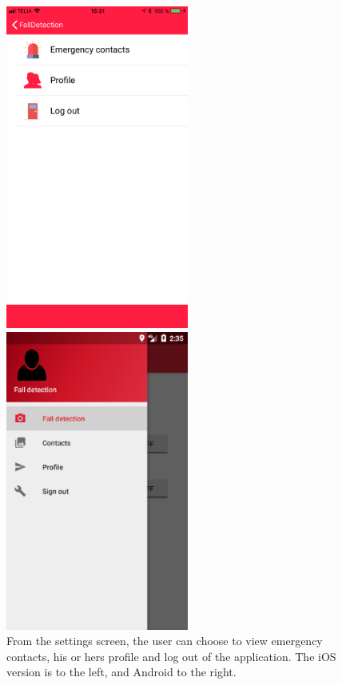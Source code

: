 \documentclass[12pt, a4paper, onecolumn]{article}
\begin{document}
	\begin{figure}[H]
		\begin{multicols}{2}
			\centering
			\includegraphics[width=6cm]{../img/screenshots/settings-screen.jpg}\par 
			\includegraphics[width=6cm]{../img/screenshots/settings-screen-android.png}\par 
		\end{multicols}
		\caption{From the settings screen, the user can choose to view emergency contacts, his or hers profile and log out of the application. The iOS version is to the left, and Android to the right.}%
		\label{fig:settings-screen}%
	\end{figure}
	
\end{document}
